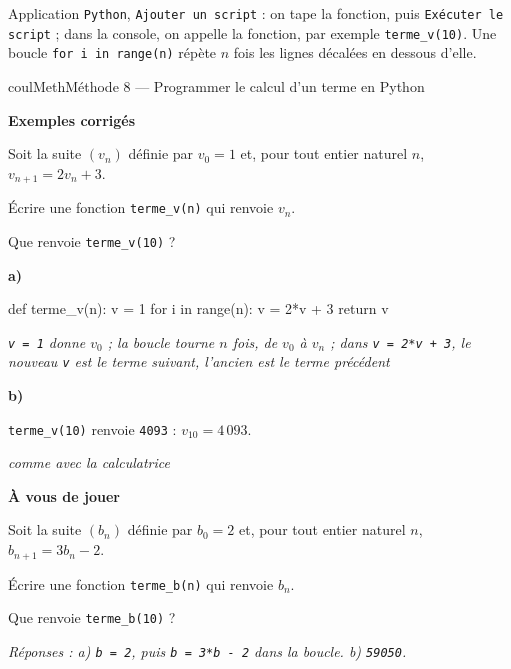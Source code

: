 \documentclass[11pt,a4paper]{article}
\makeatletter
\newcounter{lycee@signet}
\newcommand{\signet}[3][]{\stepcounter{lycee@signet}%
  \edef\lycee@dest{\if\relax\detokenize{#1}\relax
    signet.\arabic{lycee@signet}\else#1\fi}%
  \hypertarget{\lycee@dest}{}\bookmark[level=#2,dest=\lycee@dest]{#3}}
\newcommand{\res}[1]{#1}
\newcounter{methode}
\newenvironment{methodebox}[1][Méthode]{\stepcounter{methode}%
  \begin{boitecours}[phantom={\signet[methode-\arabic{methode}]{2}{#1}}]{coulMeth}{#1}}%
  {\end{boitecours}}
\newcommand{\etape}[1]{\par\smallskip\textbf{\color{coulMeth}#1}\par\nobreak\smallskip}
\newcommand{\reponse}[1]{\par\smallskip
  {\footnotesize\itshape\color{black!55}Réponses : #1}}
\newcommand{\explique}[2]{\par\smallskip\noindent
  \begin{minipage}[t]{0.57\linewidth}\raggedright #1\end{minipage}\hfill
  \begin{minipage}[t]{0.40\linewidth}\raggedright\leavevmode
    {\small\itshape\color{black!60}#2}\end{minipage}\par}
\newcommand{\cas}[1]{\par\smallskip\noindent\textbf{\color{coulExo}#1}\vadjust{\nobreak}}
\newenvironment{correction}{\par}{\par}
\newcommand{\etapeexemples}{\etape{Exemples corrigés}}
\makeatother
\begin{document}
\begin{remarquebox}
Application \texttt{Python}, \texttt{Ajouter un script} : on tape la fonction, puis
\texttt{Exécuter le script} ; dans la console, on appelle la fonction, par exemple
\texttt{terme\_v(10)}. Une boucle \texttt{for i in range(n)} répète $n$ fois les lignes
décalées en dessous d'elle.
\end{remarquebox}

\begin{methodebox}[Méthode 8 --- Programmer le calcul d'un terme en Python]
\etapeexemples
Soit la suite $(v_{n})$ définie par $v_{0}=1$ et, pour tout entier naturel $n$,
$v_{n+1}=2v_{n}+3$.
\begin{questions}[label=\alph*)]
  \item Écrire une fonction \texttt{terme\_v(n)} qui renvoie $v_{n}$.
  \item Que renvoie \texttt{terme\_v(10)} ?
\end{questions}
\begin{correction}
\cas{a)}\par\nopagebreak
\begin{minipage}[t]{0.42\linewidth}\vspace{0pt}
\begin{python}
def terme_v(n):
    v = 1
    for i in range(n):
        v = 2*v + 3
    return v
\end{python}
\end{minipage}\hfill
\begin{minipage}[t]{0.54\linewidth}\vspace{0pt}\raggedright
{\small\itshape\color{black!60}\texttt{v = 1} donne $v_{0}$ ; la boucle tourne $n$ fois,
de $v_{0}$ à $v_{n}$ ; dans \texttt{v = 2*v + 3}, le nouveau \texttt{v} est le terme
suivant, l'ancien est le terme précédent}
\end{minipage}
\cas{b)}
\explique{\texttt{terme\_v(10)} renvoie \texttt{4093} : $v_{10}=\res{4\,093}$.}{comme avec
la calculatrice}
\end{correction}

\etape{À vous de jouer}
Soit la suite $(b_{n})$ définie par $b_{0}=2$ et, pour tout entier naturel $n$,
$b_{n+1}=3b_{n}-2$.
\begin{questions}[label=\alph*)]
  \item Écrire une fonction \texttt{terme\_b(n)} qui renvoie $b_{n}$.
  \item Que renvoie \texttt{terme\_b(10)} ?
\end{questions}
\reponse{a) \texttt{b = 2}, puis \texttt{b = 3*b - 2} dans la boucle.\;
b) \texttt{59050}.}
\end{methodebox}
\end{document}
